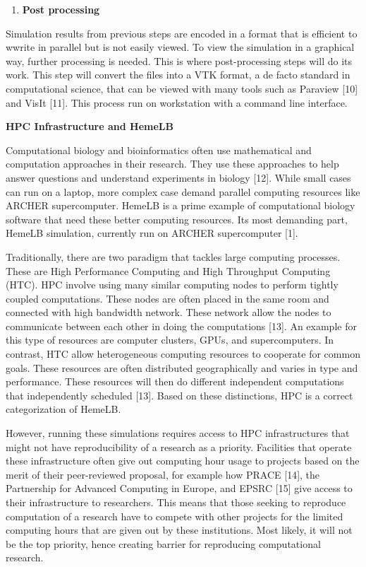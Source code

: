 \documentclass[]{article}
\providecommand{\tightlist}{%
  \setlength{\itemsep}{0pt}\setlength{\parskip}{0pt}}
\begin{document}
\begin{enumerate}
\def\labelenumi{\arabic{enumi}.}
\setcounter{enumi}{4}
\tightlist
\item
  \textbf{Post processing}
\end{enumerate}

Simulation results from previous steps are encoded in a format that is
efficient to wwrite in parallel but is not easily viewed. To view the
simulation in a graphical way, further processing is needed. This is
where post-processing steps will do its work. This step will convert the
files into a VTK format, a de facto standard in computational science,
that can be viewed with many tools such as Paraview {[}10{]} and VisIt
{[}11{]}. This process run on workstation with a command line interface.

\textbf{HPC Infrastructure and HemeLB}

Computational biology and bioinformatics often use mathematical and
computation approaches in their research. They use these approaches to
help answer questions and understand experiments in biology {[}12{]}.
While small cases can run on a laptop, more complex case demand parallel
computing resources like ARCHER supercomputer. HemeLB is a prime example
of computational biology software that need these better computing
resources. Its most demanding part, HemeLB simulation, currently run on
ARCHER supercomputer {[}1{]}.

Traditionally, there are two paradigm that tackles large computing
processes. These are High Performance Computing and High Throughput
Computing (HTC). HPC involve using many similar computing nodes to
perform tightly coupled computations. These nodes are often placed in
the same room and connected with high bandwidth network. These network
allow the nodes to communicate between each other in doing the
computations {[}13{]}. An example for this type of resources are
computer clusters, GPUs, and supercomputers. In contrast, HTC allow
heterogeneous computing resources to cooperate for common goals. These
resources are often distributed geographically and varies in type and
performance. These resources will then do different independent
computations that independently scheduled {[}13{]}. Based on these
distinctions, HPC is a correct categorization of HemeLB.

However, running these simulations requires access to HPC
infrastructures that might not have reproducibility of a research as a
priority. Facilities that operate these infrastructure often give out
computing hour usage to projects based on the merit of their
peer-reviewed proposal, for example how PRACE {[}14{]}, the Partnership
for Advanced Computing in Europe, and EPSRC {[}15{]} give access to
their infrastructure to researchers. This means that those seeking to
reproduce computation of a research have to compete with other projects
for the limited computing hours that are given out by these
institutions. Most likely, it will not be the top priority, hence
creating barrier for reproducing computational research.
\end{document}
